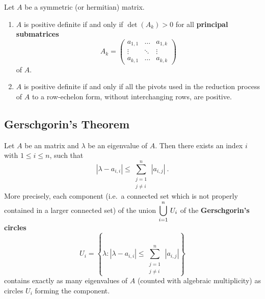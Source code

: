 \begin{theorem}
Let $A$ be a \nn symmetric (or hermitian) matrix.
\begin{enumerate}
\item $A$ is positive definite if and only if $\det(A_k) > 0$ for all
{\bfseries principal submatrices}
\[
A_k = \begin{pmatrix}
a_{1,1} & \ldots & a_{1,k} \\
\vdots & \ddots & \vdots \\
a_{k,1} & \ldots & a_{k,k}
\end{pmatrix}
\]
of $A$.
\item $A$ is positive definite if and only if all the pivots used in the
reduction process of $A$ to a row-echelon form, without interchanging
rows, are positive.
\end{enumerate}
\end{theorem}

\subsection{Gerschgorin's Theorem}

\begin{theorem}
Let $A$ be an \nn matrix and $\lambda$ be an eigenvalue of $A$.  Then
there exists an index $i$ with $1\leq i \leq n$, such that
\[
|\lambda - a_{i,i}| \leq \sum_{\substack{j=1\\ j\neq i}}^n\,|a_{i,j}| \ .
\]
More precisely, each component (i.e.\ a connected set which is not properly
contained in a larger connected set) of the union
$\displaystyle \bigcup_{i=1}^n\,U_i$ of the
{\bfseries Gerschgorin's circles}
\[
U_i = \left\{ \lambda : |\lambda - a_{i,i}| \leq
\sum_{\substack{j=1\\ j\neq i}}^n\,|a_{i,j}| \right\}
\]
contains exactly as many eigenvalues of $A$ (counted with algebraic
multiplicity) as circles $U_i$ forming the component.
\end{theorem}

